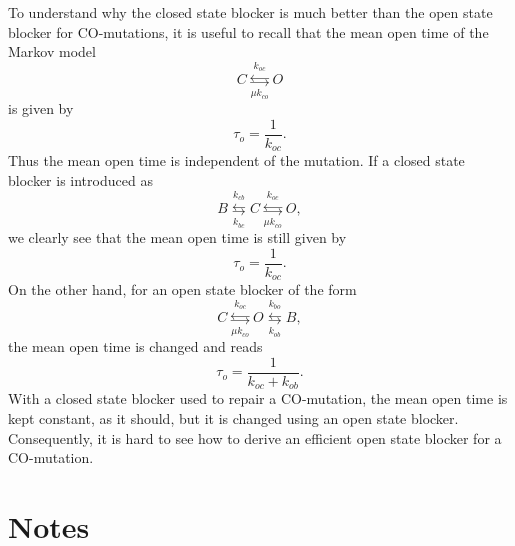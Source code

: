 To understand why the closed state blocker is much better than the open state blocker for CO-mutations, it is useful to recall that the mean open time of the Markov model
\begin{equation}
C\underset{\mu k_{co}}{\overset{k_{oc}}{\leftrightarrows}}O \label{Markov111}
\end{equation}
is given by
\[ \tau_o=\frac{1}{k_{oc}}. \]
Thus the mean open time is independent of the mutation. If a closed state blocker is introduced as
\begin{equation}
B\underset{k_{bc}}{\overset{k_{cb}}{\leftrightarrows}}C\underset{\mu
k_{co}}{\overset{k_{oc}}{\leftrightarrows}}O, 
\end{equation}
we clearly see that the mean open time is still given by
\[ \tau_o=\frac{1}{k_{oc}}. \]
On the other hand, for an open state blocker of the form
\begin{equation}
C\underset{ \mu k_{co}}{\overset{k_{oc}}{\leftrightarrows}}O\underset{k_{ob}
}{\overset{k_{bo}}{\leftrightarrows}}B,
\end{equation}
the mean open time is changed and reads
\[ \tau_o=\frac{1}{k_{oc}+k_{ob}}. \]
With a closed state blocker used to repair a CO-mutation, the mean open time is kept constant, as it should, but it is changed using an open state blocker. Consequently, it is hard to see how to derive an efficient open state blocker for a CO-mutation.

\clearpage

\section{Notes}
\label{notesdrugs}


